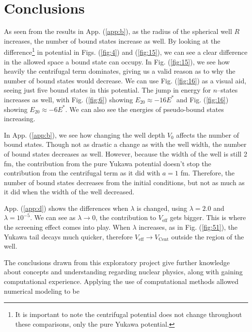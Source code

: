 \documentclass[%
 reprint,
nofootinbib,
 amsmath,amssymb,
 aps,
floatfix,
]{revtex4-2}
\begin{document}


\section{\label{sec:conclusions}Conclusions}
{
  As seen from the results in App. (\ref{app:b}), as the radius of the spherical well $R$ increases, the number of bound states increase as well. 
  By looking at the difference\footnote{It is important to note the centrifugal potential does not change throughout these comparisons, only the pure Yukawa potential.} in potential in Figs. (\ref{fig:4}) and (\ref{fig:15}), we can see a clear difference in the allowed space a bound state can occupy. 
  In Fig. (\ref{fig:15}), we see how heavily the centrifugal term dominates, giving us a valid reason as to why the number of bound states would decrease. 
  We can use Fig. (\ref{fig:16}) as a visual aid, seeing just five bound states in this potential. 
  The jump in energy for $n$--states increases as well, with Fig. (\ref{fig:6}) showing $E_{20} \approx -16E^*$ and Fig. (\ref{fig:16}) showing $E_{20} \approx -6E^*$.
  We can also see the energies of pseudo-bound states increasing. 

  In App. (\ref{app:b}), we see how changing the well depth $V_0$ affects the number of bound states. 
  Though not as drastic a change as with the well width, the number of bound states decreases as well. 
  However, because the width of the well is still 2 fm, the contribution from the pure Yukawa potential doesn't stop the contribution from the centrifugal term as it did with $a = 1$ fm. 
  Therefore, the number of bound states decreases from the initial conditions, but not as much as it did when the width of the well decreased.

  App. (\ref{app:d}) shows the differences when $\lambda$ is changed, using $\lambda = 2.0$ and $\lambda = 10^{-5}$. 
  We can see as $\lambda \rightarrow 0$, the contribution to $V_{\text{eff}}$ gets bigger. 
  This is where the screening effect comes into play. 
  When $\lambda$ increases, as in Fig. (\ref{fig:51}), the Yukawa tail decays much quicker, therefore $V_{\text{eff}} \rightarrow V_{\text{Cent}}$ outside the region of the well. 
  
  The conclusions drawn from this exploratory project give further knowledge about concepts and understanding regarding nuclear physics, along with gaining computational experience. 
  Applying the use of computational methods allowed numerical modeling to be 
}
\end{document}

